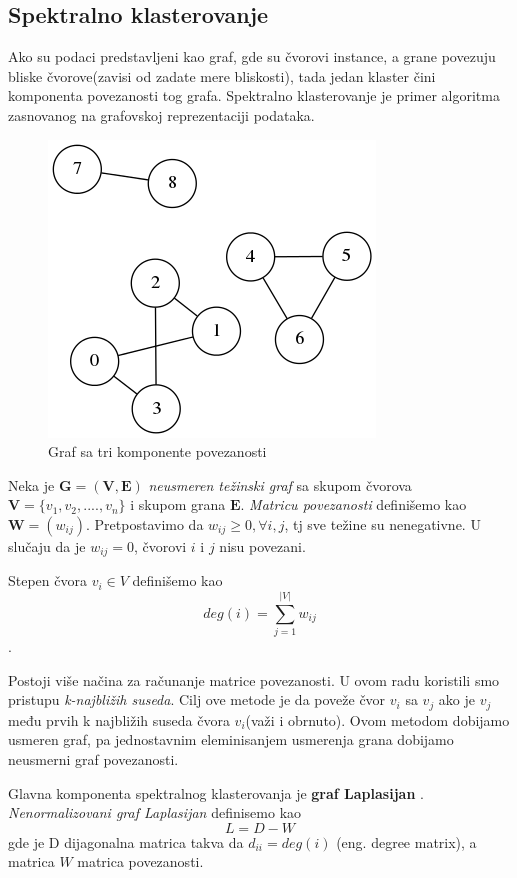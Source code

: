 \documentclass[a4paper]{article}
\begin{document}
\subsection{Spektralno klasterovanje}
Ako su podaci predstavljeni kao graf, gde su čvorovi instance, a grane povezuju bliske čvorove(zavisi od zadate mere bliskosti), tada jedan klaster čini komponenta povezanosti tog grafa. Spektralno klasterovanje je primer algoritma zasnovanog na grafovskoj reprezentaciji podataka.

\begin{figure}[h!]
\centering

\includegraphics[scale=0.6]{komponente_povezanosti}
\caption{Graf sa tri komponente povezanosti}
\end{figure}

Neka je $\mathbf{G = (V, E)}$ \textit{neusmeren težinski graf} sa skupom čvorova $\mathbf{V} = \{v_1, v_2, ...., v_n\}$ i skupom grana $\mathbf{E}$. \textit{Matricu povezanosti} definišemo kao $\mathbf{W} = (w_{ij})$. Pretpostavimo da $w_{ij} \geq 0, \forall i, j$, tj sve težine su nenegativne. U slučaju da je $w_{ij} = 0$, čvorovi $i$ i $j$ nisu povezani.

Stepen čvora $v_i \in V$ definišemo kao \[deg(i) = \sum_{j=1}^{|V|} w_{ij}\].

Postoji više načina za računanje matrice povezanosti. U ovom radu koristili smo pristupu \textit{k-najbližih suseda}. Cilj ove metode je da poveže čvor $v_i$ sa $v_j$ ako je $v_j$ među prvih k najbližih suseda čvora $v_i$(važi i obrnuto). Ovom metodom dobijamo usmeren graf, pa jednostavnim eleminisanjem usmerenja grana dobijamo neusmerni graf povezanosti.

Glavna komponenta spektralnog klasterovanja je \textbf{graf Laplasijan} \cite{von2007tutorial}. \textit{Nenormalizovani graf Laplasijan} definisemo kao \[ L = D - W\] gde je D dijagonalna matrica takva da $d_{ii} = deg(i)$ (eng. degree matrix), a matrica $W$ matrica povezanosti.
\end{document}
